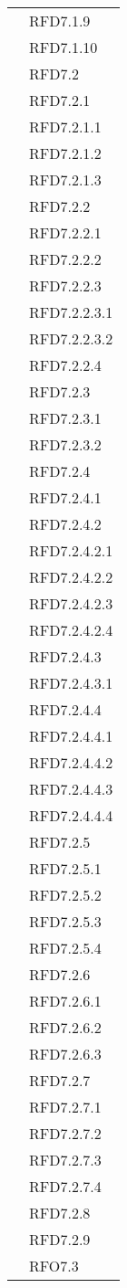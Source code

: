 \begin{longtable}{|>{\centering}m{10cm}|m{3cm}<{\centering}|}
& RFD7.1.9\\
& RFD7.1.10\\
& RFD7.2\\
& RFD7.2.1\\
& RFD7.2.1.1\\
& RFD7.2.1.2\\
& RFD7.2.1.3\\
& RFD7.2.2\\
& RFD7.2.2.1\\
& RFD7.2.2.2\\
& RFD7.2.2.3\\
& RFD7.2.2.3.1\\
& RFD7.2.2.3.2\\
& RFD7.2.2.4\\
& RFD7.2.3\\
& RFD7.2.3.1\\
& RFD7.2.3.2\\
& RFD7.2.4\\
& RFD7.2.4.1\\
& RFD7.2.4.2\\
& RFD7.2.4.2.1\\
& RFD7.2.4.2.2\\
& RFD7.2.4.2.3\\
& RFD7.2.4.2.4\\
& RFD7.2.4.3\\
& RFD7.2.4.3.1\\
& RFD7.2.4.4\\
& RFD7.2.4.4.1\\
& RFD7.2.4.4.2\\
& RFD7.2.4.4.3\\
& RFD7.2.4.4.4\\
& RFD7.2.5\\
& RFD7.2.5.1\\
& RFD7.2.5.2\\
& RFD7.2.5.3\\
& RFD7.2.5.4\\
& RFD7.2.6\\
& RFD7.2.6.1\\
& RFD7.2.6.2\\
& RFD7.2.6.3\\
& RFD7.2.7\\
& RFD7.2.7.1\\
& RFD7.2.7.2\\
& RFD7.2.7.3\\
& RFD7.2.7.4\\
& RFD7.2.8\\
& RFD7.2.9\\
& RFO7.3\\

\end{longtable}
